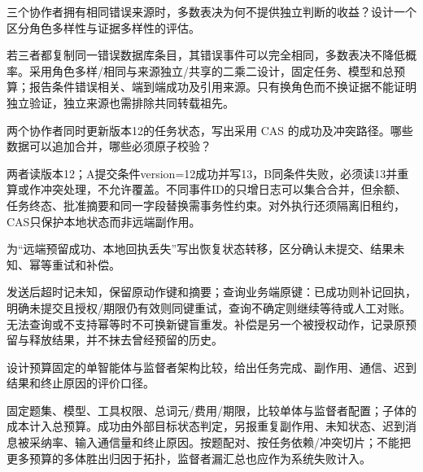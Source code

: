 \begin{exercises}
\begin{exercise}\optional 三个协作者拥有相同错误来源时，多数表决为何不提供独立判断的收益？设计一个区分角色多样性与证据多样性的评估。

\begin{solution}
若三者都复制同一错误数据库条目，其错误事件可以完全相同，多数表决不降低概率。采用角色多样/相同与来源独立/共享的二乘二设计，固定任务、模型和总预算；报告条件错误相关、端到端成功及引用来源。只有换角色而不换证据不能证明独立验证，独立来源也需排除共同转载祖先。
\end{solution}
\end{exercise}

\begin{exercise}\optional 两个协作者同时更新版本12的任务状态，写出采用 CAS 的成功及冲突路径。哪些数据可以追加合并，哪些必须原子校验？

\begin{solution}
两者读版本12；A提交条件version=12成功并写13，B同条件失败，必须读13并重算或作冲突处理，不允许覆盖。不同事件ID的只增日志可以集合合并，但余额、任务终态、批准摘要和同一字段替换需事务性约束。对外执行还须隔离旧租约，CAS只保护本地状态而非远端副作用。
\end{solution}
\end{exercise}

\begin{exercise} 为“远端预留成功、本地回执丢失”写出恢复状态转移，区分确认未提交、结果未知、幂等重试和补偿。

\begin{solution}
发送后超时记未知，保留原动作键和摘要；查询业务端原键：已成功则补记回执，明确未提交且授权/期限仍有效则同键重试，查询不确定则继续等待或人工对账。无法查询或不支持幂等时不可换新键盲重发。补偿是另一个被授权动作，记录原预留与释放结果，并不抹去曾经预留的历史。
\end{solution}
\end{exercise}

\begin{exercise}\optional 设计预算固定的单智能体与监督者架构比较，给出任务完成、副作用、通信、迟到结果和终止原因的评价口径。

\begin{solution}
固定题集、模型、工具权限、总词元/费用/期限，比较单体与监督者配置；子体的成本计入总预算。成功由外部目标状态判定，另报重复副作用、未知状态、迟到消息被采纳率、输入通信量和终止原因。按题配对、按任务依赖/冲突切片；不能把更多预算的多体胜出归因于拓扑，监督者漏汇总也应作为系统失败计入。
\end{solution}
\end{exercise}


\end{exercises}
